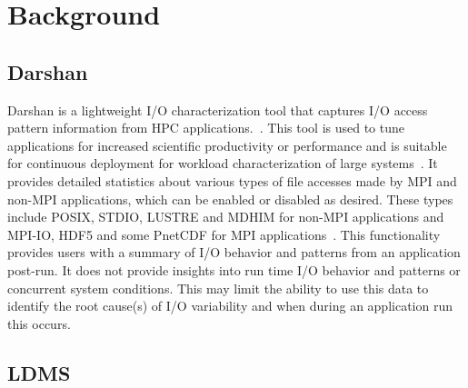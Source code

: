 \section{Background}
\label{sec:background}
\subsection{Darshan}
Darshan is a lightweight I/O characterization tool that captures I/O access pattern information from HPC applications.~\cite{Darshan}.
This tool is used to tune applications for increased scientific productivity or performance and is suitable for continuous deployment for workload characterization of large systems~\cite{darshan-webpage}. It provides detailed statistics about various types of file accesses made by MPI and non-MPI applications, which can be enabled or disabled as desired. These types include POSIX, STDIO, LUSTRE and MDHIM for non-MPI applications and MPI-IO, HDF5 and some PnetCDF for MPI applications~\cite{darshan-runtime}. This functionality provides users with a summary of I/O behavior and patterns from an application post-run. It does not provide insights into run time I/O behavior and patterns or concurrent system conditions. This may limit the ability to use this data to identify the root cause(s) of I/O variability and when during an application run this occurs. 

\subsection{LDMS}

